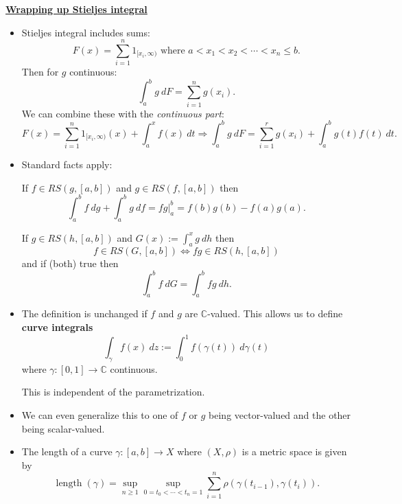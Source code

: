 \documentclass{notes}
\begin{document}
  {\boldmath \bfseries \underline{Wrapping up Stieljes integral}}

  \begin{rmk}
    \begin{itemize}
      \item Stieljes integral includes sums: 
      \[
        F(x) = \sum_{i = 1}^n 1_{[x_i, \infty)} \text{ where } a < x_1 < x_2 < \cdots < x_n \leq b.
      \]
      Then for $g$ continuous: 
      \[
        \int_a^b g\ dF = \sum_{i = 1}^n g(x_i).
      \]
      We can combine these with the \textit{continuous part}: 
      \[
        F(x) = \sum_{i = 1}^n 1_{[x_i, \infty)}(x) + \int_a^x f(x)\ dt \Rightarrow \int_a^b g\ dF = \sum_{i = 1}^r g(x_i) + \int_a^b g(t) f(t)\ dt.
      \]
      
      \item Standard facts apply: 

      \begin{lem}
        If $f \in RS(g, [a, b])$ and $g \in RS(f, [a, b])$ then 
        \[
          \int_a^b f\ dg + \int_a^b g\ df = f g \Big |_a^b = f(b) g(b) - f(a) g(a).
        \]
      \end{lem}
      
      \begin{lem}[Substitution]
        If $g \in RS(h, [a, b])$ and $G(x) := \int_a^x g\ dh$ then 
        \[
          f \in RS(G, [a, b]) \Leftrightarrow f g \in RS(h, [a, b])
        \]
        and if (both) true then 
        \[
          \int_a^b f\ dG = \int_a^b f g\ dh.
        \]
      \end{lem}
      
      \item The definition is unchanged if $f$ and $g$ are $\mathbb C$-valued.
      This allows us to define {\boldmath \bfseries curve integrals} 
      \[
        \int_\gamma f(x)\ dz := \int_0^1 f(\gamma(t))\ d\gamma(t)
      \]
      where $\gamma \colon [0, 1] \to \mathbb C$ continuous.

      This is independent of the parametrization.
      
      \item We can even generalize this to one of $f$ or $g$ being vector-valued and the other being scalar-valued.
        
      \item The length of a curve $\gamma \colon [a, b] \to X$ where $(X, \rho)$ is a metric space is given by 
      \[
        \operatorname{length}(\gamma) = \sup_{n \geq 1} \sup_{0 = t_0 < \cdots < t_n = 1} \sum_{i = 1}^n \rho(\gamma(t_{i - 1}), \gamma(t_i)).
      \]
      

\end{itemize}
\end{rmk}
\end{document}
